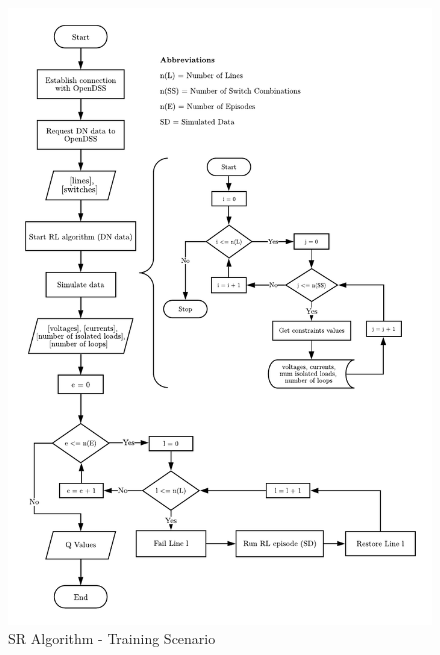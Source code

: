 \begin{figure}
    \centering
    \includegraphics[scale=0.9]{_chapter1/fig/training_scenario.pdf}
    \caption{SR Algorithm - Training Scenario}
    \label{ch1:fig:training_blocks}
\end{figure}